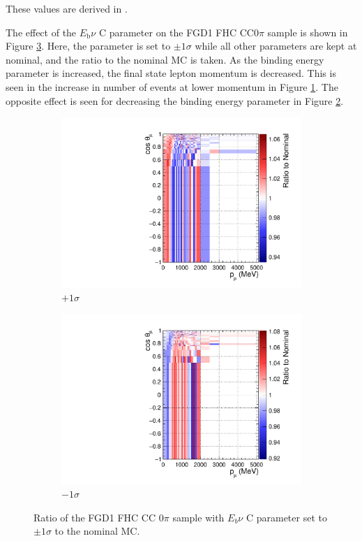 These values are derived in \cite{tn344}.

The effect of the $E_{\mathrm{b}} \nu$ C parameter on the FGD1 FHC CC0$\pi$ sample is shown in Figure \ref{fig:Ebratios}. Here, the parameter is set to $\pm1\sigma$ while all other parameters are kept at nominal, and the ratio to the nominal MC is taken. As the binding energy parameter is increased, the final state lepton momentum is decreased. This is seen in the increase in number of events at lower momentum in Figure \ref{fig:EbratiosP1}. The opposite effect is seen for decreasing the binding energy parameter in Figure \ref{fig:EbratiosM1}.

\begin{figure}
\centering
\begin{subfigure}{.5\textwidth}
  \centering
  \includegraphics[width=0.95\linewidth]{figs/EbNuCP1Ratio}
  \caption{$+1\sigma$}\label{fig:EbratiosP1}
\end{subfigure}%
\begin{subfigure}{.5\textwidth}
  \centering
  \includegraphics[width=0.95\linewidth]{figs/EbNuCM1Ratio}
  \caption{$-1\sigma$}\label{fig:EbratiosM1}
\end{subfigure}
\caption{Ratio of the FGD1 FHC CC 0$\pi$ sample with $E_{b}\nu$ C parameter set to $\pm 1\sigma$ to the nominal MC.}
\label{fig:Ebratios}
\end{figure}

